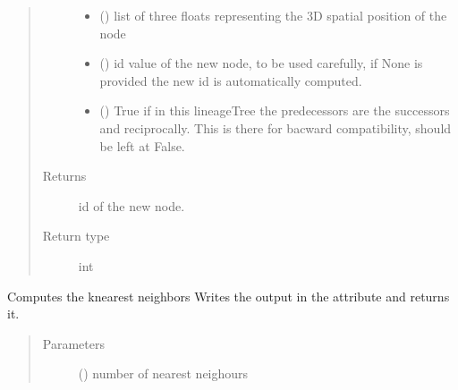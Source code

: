 \documentclass[letterpaper,10pt,english]{sphinxmanual}
\begin{document}
\begin{fulllineitems}
\begin{fulllineitems}
\begin{quote}
\begin{description}
\begin{itemize}
\item {} 
 (\sphinxstyleliteralemphasis{\sphinxupquote{{[}}}\sphinxstyleliteralemphasis{\sphinxupquote{, }}\sphinxstyleliteralemphasis{\sphinxupquote{{]}}}) \textendash{} list of three floats representing the 3D spatial position of the node

\item {} 
 () \textendash{} id value of the new node, to be used carefully,
if None is provided the new id is automatically computed.

\item {} 
 () \textendash{} True if in this lineageTree the predecessors are the successors and reciprocally.
This is there for bacward compatibility, should be left at False.

\end{itemize}

\item[{Returns}] \leavevmode
id of the new node.

\item[{Return type}] \leavevmode
int

\end{description}\end{quote}

\end{fulllineitems}


\begin{fulllineitems}
\label{\detokenize{index:LineageTree.lineageTree.compute_k_nearest_neighbours}}
Computes the k\sphinxhyphen{}nearest neighbors
Writes the output in the attribute 
and returns it.
\begin{quote}\begin{description}
\item[{Parameters}] \leavevmode
{} () \textendash{} number of nearest neighours


\end{description}
\end{quote}
\end{fulllineitems}
\end{fulllineitems}
\end{document}
